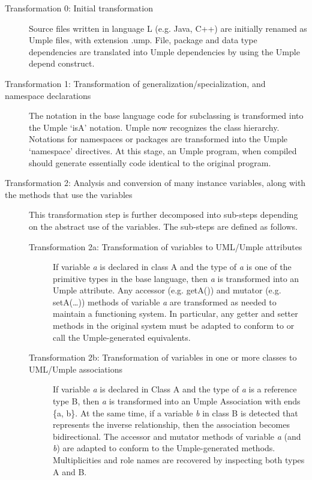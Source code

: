 \begin{description} 
\item[Transformation 0: Initial transformation] 
Source files written in language L (e.g. Java, C++) are initially renamed as Umple files, with extension .ump. File, package and data type dependencies are translated into Umple dependencies by using the Umple depend construct. 

\item [Transformation 1: Transformation of generalization/specialization, and namespace declarations]
The notation in the base language code for subclassing is transformed into the Umple `isA' notation. Umple now recognizes the class hierarchy. Notations for namespaces or packages are transformed into the Umple `namespace' directives. At this stage, an Umple program, when compiled should generate essentially code identical to the original program.

\item [Transformation 2: Analysis and conversion of many instance variables, along with the methods that use the variables]
This transformation step is further decomposed into sub-steps depending on the abstract use of the variables. The sub-steps are defined as follows.
	\begin{description}

	\item [Transformation 2a: Transformation of variables to UML/Umple attributes]
	If variable \textit{a} is declared in class A and the type of \textit{a} is one of the primitive types in the base language, then \textit{a} is transformed into an Umple attribute. Any accessor (e.g. getA()) and mutator (e.g. setA(…)) methods of variable \textit{a} are transformed as needed to maintain a functioning system. In particular, any getter and setter methods in the original system must be adapted to conform to or call the Umple-generated equivalents.
	
	\item [Transformation 2b: Transformation of variables in one or more classes to UML/Umple associations]
	If variable \textit{a} is declared in Class A and the type of \textit{a} is a reference type B, then \textit{a} is transformed into an Umple Association with ends \{a, b\}. At the same time, if a variable \textit{b} in class B is detected that represents the inverse relationship, then the association becomes bidirectional. The accessor and mutator methods of variable \textit{a} (and \textit{b}) are adapted to conform to the Umple-generated methods. Multiplicities and role names are recovered by inspecting both types A and B.


\end{description}
\end{description}
